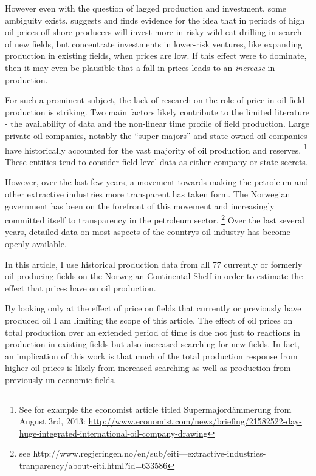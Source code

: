 \documentclass[11pt]{article}
\begin{document}
However even with the question of lagged production and investment, some ambiguity exists.  \citet{mohn_efforts_2008} suggests and finds evidence for the idea that in periods of high oil prices off-shore producers will invest more in risky wild-cat drilling in search of new fields, but concentrate investments in lower-risk ventures, like expanding production in existing fields, when prices are low.  If this effect were to dominate, then it may even be plausible that a fall in prices leads to an \emph{increase} in production. 


For such a prominent subject, the lack of research on the role of price in oil field production is striking. Two main factors likely contribute to the limited literature - the availability of data and the non-linear time profile of field production.  Large private oil companies, notably the “super majors” and state-owned oil companies have historically accounted for the vast majority of oil production and reserves. \footnote{See for example the economist article titled Supermajordämmerung from August 3rd, 2013: \url{http://www.economist.com/news/briefing/21582522-day-huge-integrated-international-oil-company-drawing}} These entities tend to consider field-level data as either company or state secrets.   

However, over the last few years, a movement towards making the petroleum and other extractive industries more transparent has taken form.  The Norwegian government has been on the forefront of this movement and increasingly committed itself to transparency in the petroleum sector. \footnote{see http://www.regjeringen.no/en/sub/eiti---extractive-industries-tranparency/about-eiti.html?id=633586} Over the last several years, detailed data on most aspects of the country\’s oil industry has become openly available.  

In this article, I use historical production data from all 77 currently or formerly oil-producing fields on the Norwegian Continental Shelf in order to estimate the effect that prices have on oil production.  

By looking only at the effect of price on fields that currently or previously have produced oil I am limiting the scope of this article.  The effect of oil prices on total production over an extended period of time is due not just to reactions in production in existing fields but also increased searching for new fields.  In fact, an implication of this work is that much of the total production response from higher oil prices is likely from increased searching as well as production from previously un-economic fields.
\end{document}
